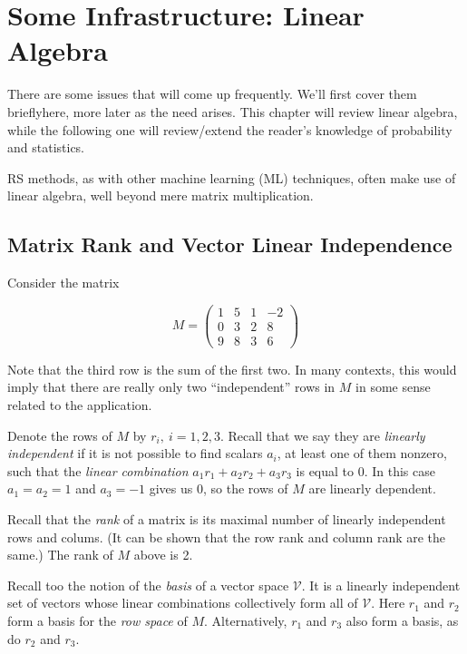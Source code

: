 \chapter{Some Infrastructure: Linear Algebra} 
\label{chap:linalg}   

There are some issues that will come up frequently.  We'll first cover them
brieflyhere, more later as the need arises.  This chapter will review
linear algebra, while the following one will review/extend the reader's
knowledge of probability and statistics.

RS methods, as with other machine learning (ML) techniques, often make
use of linear algebra, well beyond mere matrix multiplication. 

\section{Matrix Rank and Vector Linear Independence}

Consider the matrix

\begin{equation}
\label{rankex1}
M = 
\left (
\begin{array}{rrrr}
1 & 5 & 1 & -2\\
0 & 3 & 2 & 8\\
9 & 8 & 3 & 6 
\end{array}
\right )
\end{equation}

Note that the third row is the sum of the first two.  In many contexts,
this would imply that there are really only two ``independent'' rows in
$M$ in some sense related to the application.  

Denote the rows of $M$ by $r_i, ~ i = 1,2,3$.  Recall that we say they
are \textit{linearly independent} if it is not possible to find scalars
$a_i$, at least one of them nonzero, such that the \textit{linear
combination} $a_1 r_1 + a_2 r_2 + a_3 r_3$ is equal to 0.  In this case
$a_1 = a_2 = 1$ and $a_3 = -1$ gives us 0, so the rows of $M$ are
linearly dependent.

Recall that the \textit{rank} of a matrix is its maximal number of
linearly independent rows and colums.  (It can be shown that the row
rank and column rank are the same.)  The rank of $M$ above is 2.

Recall too the notion of the \textit{basis} of a vector space
$\mathcal{V}$.  It is a linearly independent set of vectors whose linear
combinations collectively form all of $\mathcal{V}$.  Here  $r_1$ and
$r_2$ form a basis for the \textit{row space} of $M$.  Alternatively,
$r_1$ and $r_3$ also form a basis, as do $r_2$ and $r_3$.

